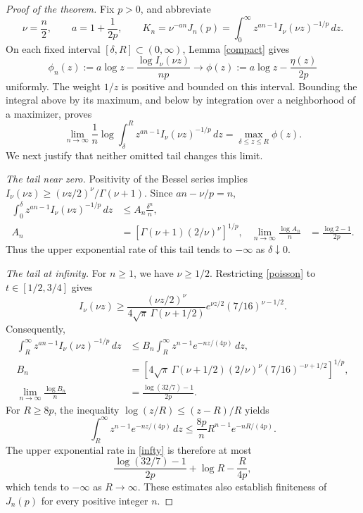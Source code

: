 \documentclass[11pt]{article}
\begin{document}
\begin{proof}[Proof of the theorem]
Fix \(p>0\), and abbreviate
\[
 \nu=\frac n2,\qquad a=1+\frac1{2p},\qquad
 K_n=\nu^{-an}J_n(p)
 =\int_0^\infty z^{an-1} I_\nu(\nu z)^{-1/p}\,dz .
\]
On each fixed interval \([\delta,R]\subset(0,\infty)\), Lemma
\ref{compact} gives
\[
 \phi_n(z):=a\log z-\frac{\log I_\nu(\nu z)}{np}
 \longrightarrow
 \phi(z):=a\log z-\frac{\eta(z)}{2p}
\]
uniformly. The weight \(1/z\) is positive and bounded on this interval.
Bounding the integral above by its maximum, and below by integration
over a neighborhood of a maximizer, proves
\begin{equation}\label{laplace}
 \lim_{n\to\infty}\frac1n
 \log\int_\delta^R z^{an-1}I_\nu(\nu z)^{-1/p}\,dz
 =\max_{\delta\le z\le R}\phi(z).
\end{equation}
We next justify that neither omitted tail changes this limit.

\emph{The tail near zero.}
Positivity of the Bessel series implies
\(I_\nu(\nu z)\ge(\nu z/2)^\nu/\Gamma(\nu+1)\).
Since \(an-\nu/p=n\),
\begin{align}
 \int_0^\delta z^{an-1}I_\nu(\nu z)^{-1/p}\,dz
 &\le A_n\frac{\delta^n}{n},\label{zero}\\
 A_n&=\left[\Gamma(\nu+1)(2/\nu)^\nu\right]^{1/p},
 &\lim_{n\to\infty}\frac{\log A_n}{n}
 &=\frac{\log2-1}{2p}.\nonumber
\end{align}
Thus the upper exponential rate of this tail tends to \(-\infty\)
as \(\delta\downarrow0\).

\emph{The tail at infinity.}
For \(n\ge1\), we have \(\nu\ge1/2\).
Restricting \eqref{poisson} to \(t\in[1/2,3/4]\) gives
\[
 I_\nu(\nu z)\ge
 \frac{(\nu z/2)^\nu}{4\sqrt{\pi}\,\Gamma(\nu+1/2)}
 e^{\nu z/2}(7/16)^{\nu-1/2}.
\]
Consequently,
\begin{align}
 \int_R^\infty z^{an-1}I_\nu(\nu z)^{-1/p}\,dz
 &\le B_n\int_R^\infty z^{n-1}e^{-nz/(4p)}\,dz,\label{infty}\\
 B_n&=\left[
 4\sqrt{\pi}\,\Gamma(\nu+1/2)(2/\nu)^\nu
 (7/16)^{-\nu+1/2}\right]^{1/p},\nonumber\\
 \lim_{n\to\infty}\frac{\log B_n}{n}
 &=\frac{\log(32/7)-1}{2p}.\nonumber
\end{align}
For \(R\ge8p\), the inequality
\(\log(z/R)\le(z-R)/R\) yields
\[
 \int_R^\infty z^{n-1}e^{-nz/(4p)}\,dz
 \le\frac{8p}{n}R^{n-1}e^{-nR/(4p)}.
\]
The upper exponential rate in \eqref{infty} is therefore at most
\[
 \frac{\log(32/7)-1}{2p}+\log R-\frac{R}{4p},
\]
which tends to \(-\infty\) as \(R\to\infty\).
These estimates also establish finiteness of \(J_n(p)\) for every
positive integer \(n\).


\end{proof}
\end{document}
